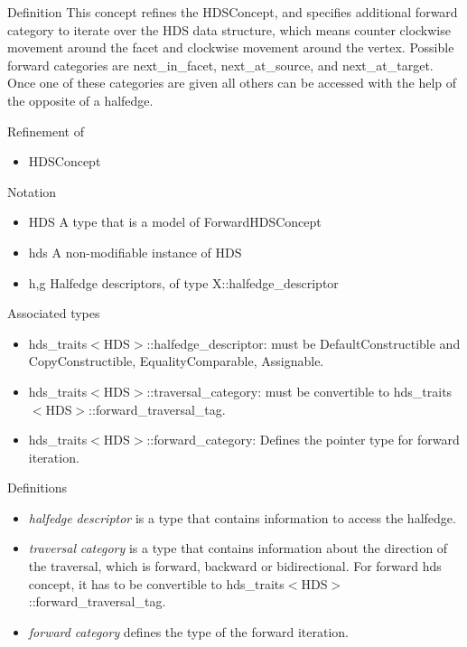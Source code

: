 \begin{Desc}
\item[Definition]This concept refines the HDSConcept, and specifies additional forward category to iterate over the HDS data structure, which means counter clockwise movement around the facet and clockwise movement around the vertex. Possible forward categories are next\_\-in\_\-facet, next\_\-at\_\-source, and next\_\-at\_\-target. Once one of these categories are given all others can be accessed with the help of the opposite of a halfedge.\end{Desc}
\begin{Desc}
\item[Refinement of]\begin{itemize}
\item HDSConcept\end{itemize}
\end{Desc}
\begin{Desc}
\item[Notation]\begin{itemize}
\item HDS A type that is a model of Forward\-HDSConcept\item hds A non-modifiable instance of HDS\item h,g Halfedge descriptors, of type X::halfedge\_\-descriptor\end{itemize}
\end{Desc}
\begin{Desc}
\item[Associated types]\begin{itemize}
\item hds\_\-traits$<$HDS$>$::halfedge\_\-descriptor: must be Default\-Constructible and Copy\-Constructible, Equality\-Comparable, Assignable.\item hds\_\-traits$<$HDS$>$::traversal\_\-category: must be convertible to hds\_\-traits$<$HDS$>$::forward\_\-traversal\_\-tag.\item hds\_\-traits$<$HDS$>$::forward\_\-category: Defines the pointer type for forward iteration.\end{itemize}
\end{Desc}
\begin{Desc}
\item[Definitions]\begin{itemize}
\item {\em halfedge\/} {\em descriptor\/} is a type that contains information to access the halfedge.\item {\em traversal\/} {\em category\/} is a type that contains information about the direction of the traversal, which is forward, backward or bidirectional. For forward hds concept, it has to be convertible to hds\_\-traits$<$HDS$>$::forward\_\-traversal\_\-tag.\item {\em forward\/} {\em category\/} defines the type of the forward iteration.\end{itemize}
\end{Desc}
